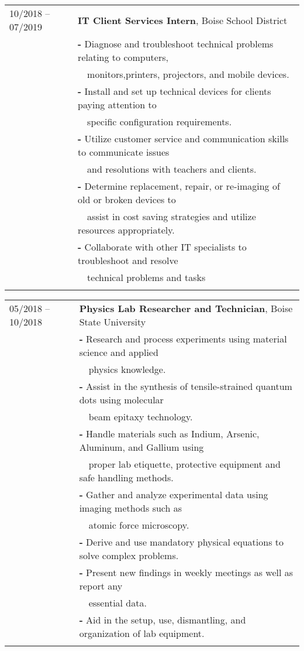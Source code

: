 \documentclass[a4paper,12pt]{article}
\begin{document}
\begin{tabular}{ll}
10/2018 -- 07/2019 & \textbf{IT Client Services Intern}, Boise School District\\
         & \textbf{-} Diagnose and troubleshoot technical problems relating to computers,\\ 
         & \-\ \-\  monitors,printers, projectors, and mobile devices. \\
         & \textbf{-} Install and set up technical devices for clients paying attention to\\ 
         & \-\ \-\ specific configuration requirements. \\
         & \textbf{-} Utilize customer service and communication skills to communicate issues\\ 
         & \-\ \-\ and resolutions with teachers and clients.\\
         & \textbf{-} Determine replacement, repair, or re-imaging of old or broken devices to\\ 
         & \-\ \-\ assist in cost saving strategies and utilize resources appropriately. \\
         & \textbf{-} Collaborate with other IT specialists to troubleshoot and resolve\\
         & \-\ \-\ technical problems and tasks \\
         \\
\end{tabular}

\begin{tabular}{ll}
05/2018 -- 10/2018  & \textbf{Physics Lab Researcher and Technician}, Boise State University\\
         & \textbf{-} Research and process experiments using material science and applied\\
         & \-\ \-\ physics knowledge.\\
         & \textbf{-} Assist in the synthesis of tensile-strained quantum dots using molecular\\
         & \-\ \-\ beam epitaxy technology.\\
         & \textbf{-} Handle materials such as Indium, Arsenic, Aluminum, and Gallium using\\
         & \-\ \-\ proper lab etiquette, protective equipment and safe handling methods. \\
         & \textbf{-} Gather and analyze experimental data using imaging methods such as\\
         & \-\ \-\ atomic force microscopy. \\
         & \textbf{-} Derive and use mandatory physical equations to solve complex problems. \\
         & \textbf{-} Present new findings in weekly meetings as well as report any\\
         & \-\ \-\ essential data. \\
         & \textbf{-} Aid in the setup, use, dismantling, and organization of lab equipment. \\
         \\
    
\end{tabular}
\end{document}
